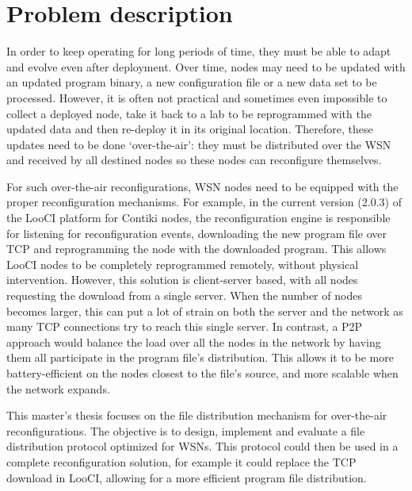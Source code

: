 \section{Problem description}
\label{sec:intro:problem}
In order to keep  operating for long periods of time, they must be able to adapt and evolve even after deployment. Over time, nodes may need to be updated with an updated program binary, a new configuration file or a new data set to be processed. However, it is often not practical and sometimes even impossible to collect a deployed node, take it back to a lab to be reprogrammed with the updated data and then re-deploy it in its original location. Therefore, these updates need to be done `over-the-air': they must be distributed over the \gls{WSN} and received by all destined nodes so these nodes can reconfigure themselves.

For such over-the-air reconfigurations, \gls{WSN} nodes need to be equipped with the proper reconfiguration mechanisms. For example, in the current version (2.0.3) of the LooCI \cite{looci} platform for Contiki \cite{contiki} nodes, the reconfiguration engine is responsible for listening for reconfiguration events, downloading the new program file over \gls{TCP} and reprogramming the node with the downloaded program. This allows LooCI nodes to be completely reprogrammed remotely, without physical intervention. However, this solution is client-server based, with all nodes requesting the download from a single server. When the number of nodes becomes larger, this can put a lot of strain on both the server and the network as many \gls{TCP} connections try to reach this single server. In contrast, a \gls{P2P} approach would balance the load over all the nodes in the network by having them all participate in the program file's distribution. This allows it to be more battery-efficient on the nodes closest to the file's source, and more scalable when the network expands.

This master's thesis focuses on the file distribution mechanism for over-the-air reconfigurations. The objective is to design, implement and evaluate a file distribution protocol optimized for \glspl{WSN}. This protocol could then be used in a complete reconfiguration solution, for example it could replace the \gls{TCP} download in LooCI, allowing for a more efficient program file distribution.

